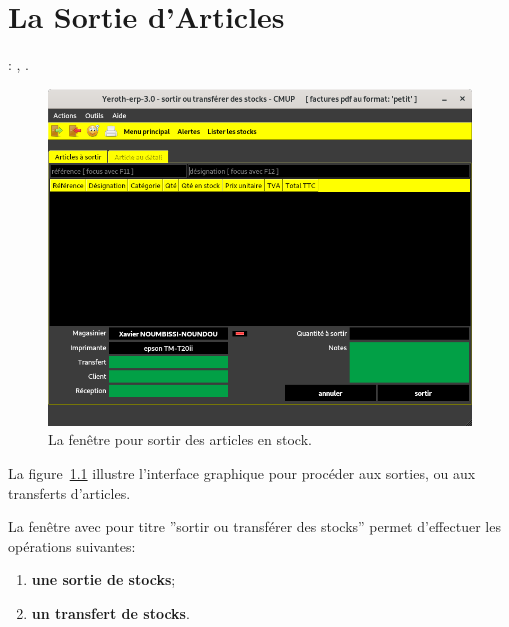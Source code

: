 \chapter{La Sortie d'Articles}\label{chap:sortir-articles}

\utilisateurs: \lienmagasinier, \lienmanager.\\



\begin{figure}[!htbp]
	\centering
	\includegraphics[scale=0.63]{images/yeren-fenetre-sortir-articles.png}
	\caption{La fen\^etre pour sortir des articles en stock.}
	\label{fig:yeren-fenetre-sortir-articles}
\end{figure}

La figure~\ref{fig:yeren-fenetre-sortir-articles} illustre
l'interface graphique pour proc\'eder aux sorties, ou aux
transferts d'articles.

La fen\^etre avec pour titre ''sortir ou transf\'erer des stocks''
permet d'effectuer les op\'erations suivantes:
\begin{enumerate}[1)]
	\item \textbf{une sortie de stocks};
	\item \textbf{un transfert de stocks}.\\
\end{enumerate}

